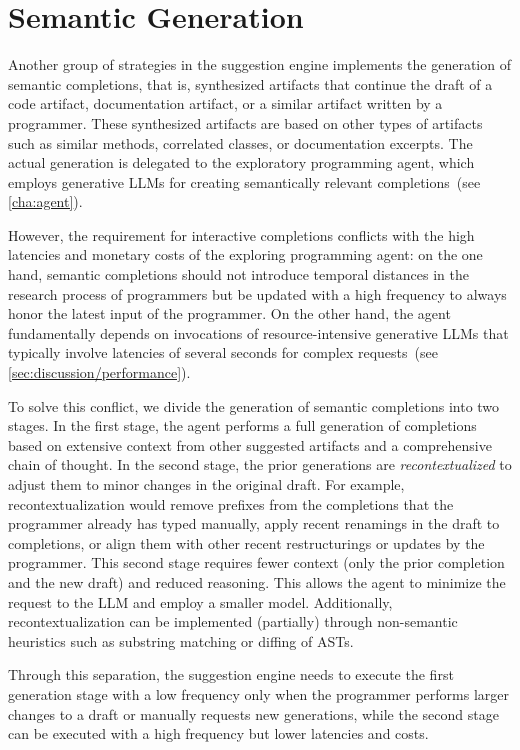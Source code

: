 
\section{Semantic Generation}
\label{sec:suggestions/generation}

Another group of strategies in the suggestion engine implements the generation of semantic completions, that is, synthesized artifacts that continue the draft of a code artifact, documentation artifact, or a similar artifact written by a programmer.
These synthesized artifacts are based on other types of artifacts such as similar methods, correlated classes, or documentation excerpts.
The actual generation is delegated to the exploratory programming agent, which employs generative LLMs for creating semantically relevant completions~(see \cref{cha:agent}).

However, the requirement for interactive completions conflicts with the high latencies and monetary costs of the exploring programming agent:
on the one hand, semantic completions should not introduce temporal distances in the research process of programmers but be updated with a high frequency to always honor the latest input of the programmer.
On the other hand, the agent fundamentally depends on invocations of resource-intensive generative LLMs that typically involve latencies of several seconds for complex requests~(see \cref{sec:discussion/performance}).

To solve this conflict, we divide the generation of semantic completions into two stages.
In the first stage, the agent performs a full generation of completions based on extensive context from other suggested artifacts and a comprehensive chain of thought.
In the second stage, the prior generations are \emph{recontextualized} to adjust them to minor changes in the original draft.
For example, recontextualization would remove prefixes from the completions that the programmer already has typed manually, apply recent renamings in the draft to completions, or align them with other recent restructurings or updates by the programmer.
This second stage requires fewer context (only the prior completion and the new draft) and reduced reasoning.
This allows the agent to minimize the request to the LLM and employ a smaller model.
Additionally, recontextualization can be implemented (partially) through non-semantic heuristics such as substring matching or diffing of ASTs.

Through this separation, the suggestion engine needs to execute the first generation stage with a low frequency only when the programmer performs larger changes to a draft or manually requests new generations, while the second stage can be executed with a high frequency but lower latencies and costs.

